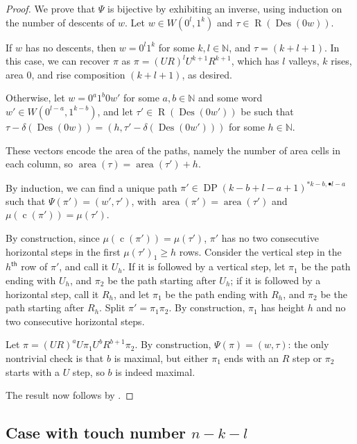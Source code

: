 \documentclass[reqno]{amsart}
\theoremstyle{plain}
\theoremstyle{definition}
\theoremstyle{remark}
\renewcommand{\th}{^\mathsf{th}}
\DeclareMathOperator{\R}{R}
\DeclareMathOperator{\DP}{DP}
\DeclareMathOperator{\area}{area}
\DeclareMathOperator{\Des}{Des}
\DeclareMathOperator{\cc}{c}
\newcommand{\<}{\langle}
\renewcommand{\>}{\rangle}
\begin{document}
\begin{proof}
    We prove that $\Psi$ is bijective by exhibiting an inverse, using induction on the number of descents of $w$. Let $w \in W(0^l, 1^k)$ and $\tau \in \R(\Des(0w))$.
    
    If $w$ has no descents, then $w = 0^l 1^k$ for some $k,l \in \mathbb{N}$, and $\tau = (k+l+1)$. In this case, we can recover $\pi$ as $\pi = (UR)^l U^{k+1} R^{k+1}$, which has $l$ valleys, $k$ rises, area $0$, and rise composition $(k+l+1)$, as desired.

    Otherwise, let $w = 0^a 1^b 0 w'$ for some $a,b \in \mathbb{N}$ and some word $w' \in W \left(0^{l-a},1^{k-b}\right)$, and let $\tau' \in \R(\Des(0w'))$ be such that $\tau - \delta(\Des(0w)) = (h, \tau' - \delta(\Des(0w')))$ for some $h \in \mathbb{N}$. 

    These vectors encode the area of the paths, namely the number of area cells in each column, so $\area(\tau) = \area(\tau') + h$.

    By induction, we can find a unique path $\pi' \in \DP(k-b+l-a+1)^{\ast k-b, \bullet l-a}$ such that $\Psi(\pi') = (w',\tau')$, with $\area(\pi') = \area(\tau')$ and $\mu(\cc(\pi')) = \mu(\tau')$.

    By construction, since $\mu(\cc(\pi')) = \mu(\tau')$, $\pi'$ has no two consecutive horizontal steps in the first $\mu(\tau')_1 \geq h$ rows. Consider the vertical step in the $h\th$ row of $\pi'$, and call it $U_h$. If it is followed by a vertical step, let $\pi_1$ be the path ending with $U_h$, and $\pi_2$ be the path starting after $U_h$; if it is followed by a horizontal step, call it $R_h$, and let $\pi_1$ be the path ending with $R_h$, and $\pi_2$ be the path starting after $R_h$. Split $\pi' = \pi_1 \pi_2$. By construction, $\pi_1$ has height $h$ and no two consecutive horizontal steps.

    Let $\pi = (UR)^a U \pi_1 U^b R^{b+1} \pi_2$. By construction, $\Psi(\pi) = (w, \tau)$: the only nontrivial check is that $b$ is maximal, but either $\pi_1$ ends with an $R$ step or $\pi_2$ starts with a $U$ step, so $b$ is indeed maximal.

    The result now follows by .
\end{proof}


\subsection{Case with touch number \texorpdfstring{$n-k-l$}{n-k-l}}
\end{document}
